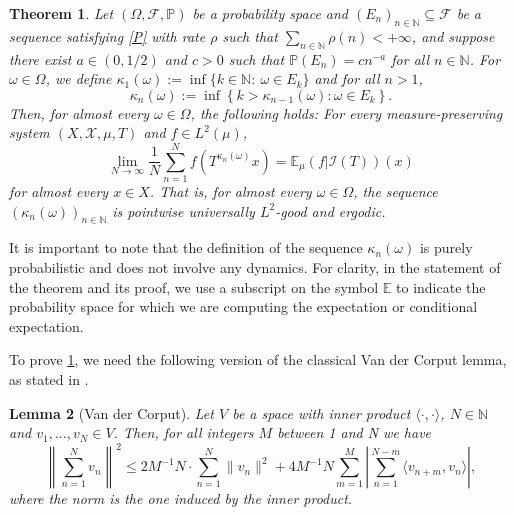 \documentclass[11pt]{amsart}
\numberwithin{equation}{section}
\newtheorem{lemma}{Lemma}[section]
\newtheorem{theorem}[lemma]{Theorem}
\theoremstyle{definition}
\theoremstyle{plain}
\newcommand{\E}{{\mathbb E}}
\newcommand{\N}{{\mathbb N}}
\begin{document}
\begin{theorem}
    Let $(\Omega,\mathcal{F},\mathbb{P})$ be a probability space and $(E_n)_{n\in \N}\subseteq \mathcal{F}$ be a sequence satisfying \eqref{P} with rate $\rho$ such that $\sum_{n\in\N}\rho(n)<+\infty$, and suppose there exist $a\in (0,1/2)$ and $c>0$ such that $\mathbb{P}(E_n)=cn^{-a}$ for all $n\in\N$. For $\omega\in \Omega$, we define  $\kappa_1(\omega):=\inf\{k\in \N:\ \omega\in E_k\}$ and for all $n>1$,
    \[\kappa_n(\omega):=\inf\left\{k>\kappa_{n-1}(\omega): \omega\in E_{k} \right\}.\]
    Then, for almost every $\omega\in \Omega$, the following holds: For every measure-preserving system $(X,\mathcal{X},\mu,T)$ and $f\in L^{2}(\mu)$,
    \begin{equation}
        \lim_{N\to\infty}\dfrac{1}{N}\sum_{n=1}^Nf(T^{\kappa_n(\omega)}x)=\mathbb{E}_{\mu}(f|\mathcal{I}(T))(x)\label{teo_eq}
    \end{equation}
   for almost every $x\in X$. That is, for almost every $\omega\in \Omega$, the sequence $(\kappa_n(\omega))_{n\in \N}$ is pointwise universally $L^2$-good and ergodic.\label{main} 
\end{theorem}
It is important to note that the definition of the sequence $\kappa_n(\omega)$ is purely probabilistic and does not involve any dynamics.  For clarity, in the statement of the theorem and its proof, we use a subscript on the symbol $\E$ to indicate the probability space for which we are computing the expectation or conditional expectation.


To prove \cref{main}, we need the following version of the classical Van der Corput lemma, as stated in \cite[Lemma A.4]{Frantzikinakis_Lesigne_Wierdl}.

\begin{lemma}[Van der Corput] Let $V$ be a space with inner product $\langle\cdot, \cdot \rangle$, $N\in \mathbb{N}$ and $v_1,...,v_N\in V$. Then, for all integers $M$ between 1 and N we have
\[\left\| \sum_{n=1}^{N} v_n\right\|^2\leq 2M^{-1}N \cdot \sum_{n=1}^{N}\|v_n\|^2+4M^{-1}N\sum_{m=1}^{M}\left |\sum_{n=1}^{N-m} \langle v_{n+m},v_n \rangle\right |,\]
where the norm is the one induced by the inner product.
\label{vdc}
\end{lemma}
\end{document}
